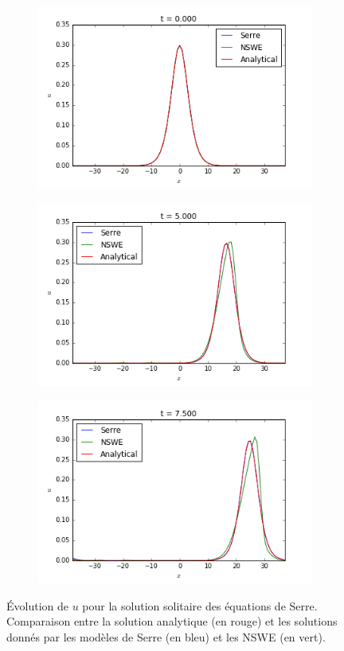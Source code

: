 \begin{figure}[h!]
	\begin{subfigure}{.3\linewidth}
		\includegraphics[scale=.3]{figures/Serre/4x4solitary1u.png}	
	\end{subfigure}
	\begin{subfigure}{.3\linewidth}
		\includegraphics[scale=.3]{figures/Serre/4x4solitary2u.png}	
	\end{subfigure}
	\begin{subfigure}{.3\linewidth}
		\includegraphics[scale=.3]{figures/Serre/4x4solitary3u.png}	
	\end{subfigure}
	\caption{Évolution de $u$ pour la solution solitaire des équations de Serre. Comparaison entre la solution analytique (en rouge) et les solutions donnés par les modèles de Serre (en bleu) et les NSWE (en vert).  \label{fig:solitaryu}}
\end{figure}

